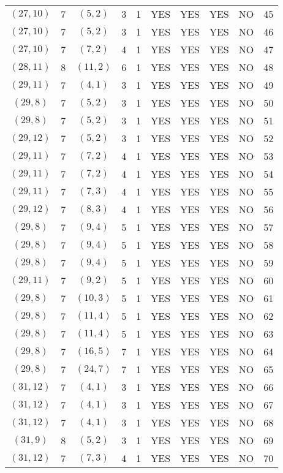 \begin{longtable}{|c|c|c|c|c|c|c|c|c|c|}
$(27, 10)$ & 7 & $(5, 2)$ & 3 & 1 & YES & YES & YES & NO & 45\\
$(27, 10)$ & 7 & $(5, 2)$ & 3 & 1 & YES & YES & YES & NO & 46\\
$(27, 10)$ & 7 & $(7, 2)$ & 4 & 1 & YES & YES & YES & NO & 47\\
$(28, 11)$ & 8 & $(11, 2)$ & 6 & 1 & YES & YES & YES & NO & 48\\
$(29, 11)$ & 7 & $(4, 1)$ & 3 & 1 & YES & YES & YES & NO & 49\\
$(29, 8)$ & 7 & $(5, 2)$ & 3 & 1 & YES & YES & YES & NO & 50\\
$(29, 8)$ & 7 & $(5, 2)$ & 3 & 1 & YES & YES & YES & NO & 51\\
$(29, 12)$ & 7 & $(5, 2)$ & 3 & 1 & YES & YES & YES & NO & 52\\
$(29, 11)$ & 7 & $(7, 2)$ & 4 & 1 & YES & YES & YES & NO & 53\\
$(29, 11)$ & 7 & $(7, 2)$ & 4 & 1 & YES & YES & YES & NO & 54\\
$(29, 11)$ & 7 & $(7, 3)$ & 4 & 1 & YES & YES & YES & NO & 55\\
$(29, 12)$ & 7 & $(8, 3)$ & 4 & 1 & YES & YES & YES & NO & 56\\
$(29, 8)$ & 7 & $(9, 4)$ & 5 & 1 & YES & YES & YES & NO & 57\\
$(29, 8)$ & 7 & $(9, 4)$ & 5 & 1 & YES & YES & YES & NO & 58\\
$(29, 8)$ & 7 & $(9, 4)$ & 5 & 1 & YES & YES & YES & NO & 59\\
$(29, 11)$ & 7 & $(9, 2)$ & 5 & 1 & YES & YES & YES & NO & 60\\
$(29, 8)$ & 7 & $(10, 3)$ & 5 & 1 & YES & YES & YES & NO & 61\\
$(29, 8)$ & 7 & $(11, 4)$ & 5 & 1 & YES & YES & YES & NO & 62\\
$(29, 8)$ & 7 & $(11, 4)$ & 5 & 1 & YES & YES & YES & NO & 63\\
$(29, 8)$ & 7 & $(16, 5)$ & 7 & 1 & YES & YES & YES & NO & 64\\
$(29, 8)$ & 7 & $(24, 7)$ & 7 & 1 & YES & YES & YES & NO & 65\\
$(31, 12)$ & 7 & $(4, 1)$ & 3 & 1 & YES & YES & YES & NO & 66\\
$(31, 12)$ & 7 & $(4, 1)$ & 3 & 1 & YES & YES & YES & NO & 67\\
$(31, 12)$ & 7 & $(4, 1)$ & 3 & 1 & YES & YES & YES & NO & 68\\
$(31, 9)$ & 8 & $(5, 2)$ & 3 & 1 & YES & YES & YES & NO & 69\\
$(31, 12)$ & 7 & $(7, 3)$ & 4 & 1 & YES & YES & YES & NO & 70\\

\end{longtable}
